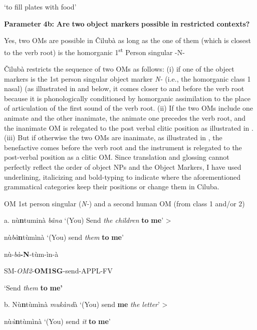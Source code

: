 \documentclass[output=paper]{langscibook}
\begin{document}
\glt ‘to fill plates with food’

\textbf{Parameter} \textbf{4b:} \textbf{Are} \textbf{two} \textbf{object} \textbf{markers} \textbf{possible} \textbf{in} \textbf{restricted} \textbf{contexts?}

Yes, two OMs are possible in Čilubà as long as the one of them (which is closest to the verb root) is the homorganic 1\textsuperscript{st} Person singular -N-

Čilubà restricts the sequence of two OMs as follows: (i) if one of the object markers is the 1st person singular object marker \textit{N-} (i.e., the homorganic class 1 nasal) (as illustrated in  and  below, it comes closer to and before the verb root because it is phonologically conditioned by homorganic assimilation to the place of articulation of the first sound of the verb root. (ii) If the two OMs include one animate and the other inanimate, the animate one precedes the verb root, and the inanimate OM is relegated to the post verbal clitic position as illustrated in . (iii) But if otherwise the two OMs are inanimate, as illustrated in , the benefactive comes before the verb root and the instrument is relegated to the post-verbal position as a clitic OM. Since translation and glossing cannot perfectly reflect the order of object NPs and the Object Markers, I have used underlining, italicizing and bold-typing to indicate where the aforementioned grammatical categories keep their positions or change them in Ciluba.

\ea%
    \label{ex:lukusa:32}
    \z

         OM 1st person singular (\textit{N-}) and a second human OM (from class 1 and/or 2)

a.  nù\textbf{n}tuminà    \textit{bâna}        ‘(You) Send \textit{the children} \textbf{to} \textbf{me}’  >

nù\textit{bà}\textbf{n}tùmìnà            ‘(You) send \textit{them} \textbf{to} \textbf{me}’  

nù-\textit{bà}\textbf{{}-N}{}-tùm-ìn-à  

SM-\textit{OM2}{}-\textbf{OM1SG}{}-send-APPL-FV  

\glt ‘Send \textit{them} \textbf{to} \textbf{me’}

b.  Nù\textbf{n}tùmìnà \textit{mukànd}à      ‘(You) send \textbf{me} \textit{the letter}’       >

nù\textit{ù}\textbf{n}tùmìnà            ‘(You) send \textit{it} \textbf{to} \textbf{me}’  
\end{document}
